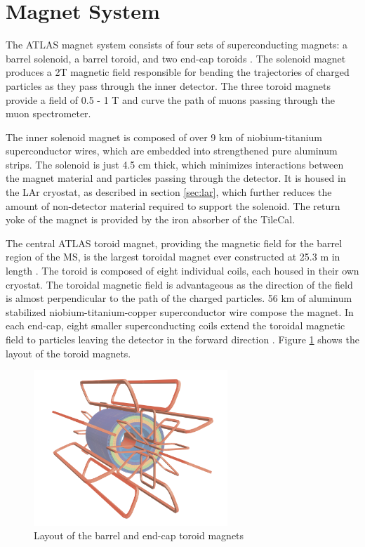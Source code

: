 \section{Magnet System}
\label{sec:magnets}
The ATLAS magnet system consists of four sets of superconducting magnets: a barrel solenoid, a barrel toroid, and two end-cap toroids \cite{magnet_tdr}. The solenoid magnet produces a 2T magnetic field responsible for bending the trajectories of charged particles as they pass through the inner detector. The three toroid magnets provide a field of 0.5 - 1 T and curve the path of muons passing through the muon spectrometer.\par

The inner solenoid magnet is composed of over 9 km of niobium-titanium superconductor wires, which are embedded into strengthened pure aluminum strips. The solenoid is just 4.5 cm thick, which minimizes interactions between the magnet material and particles passing through the detector. It is housed in the LAr cryostat, as described in section \ref{sec:lar}, which further reduces the amount of non-detector material required to support the solenoid. The return yoke of the magnet is provided by the iron absorber of the TileCal.\par

The central ATLAS toroid magnet, providing the magnetic field for the barrel region of the MS, is the largest toroidal magnet ever constructed at 25.3 m in length \cite{cern_magnet_page}. The toroid is composed of eight individual coils, each housed in their own cryostat. The toroidal magnetic field is advantageous as the direction of the field is almost perpendicular to the path of the charged particles. 56 km of aluminum stabilized niobium-titanium-copper superconductor wire compose the magnet. In each end-cap, eight smaller superconducting coils extend the toroidal magnetic field to particles leaving the detector in the forward direction \cite{magnet_tdr}. Figure \ref{fig:magnets} shows the layout of the toroid magnets.

\begin{figure}
        \centering
	\includegraphics[width=0.65\textwidth]{figures/ch4/magnets.png}
	\caption{Layout of the barrel and end-cap toroid magnets \cite{atlas_overview} }
	\label{fig:magnets}
\end{figure}

